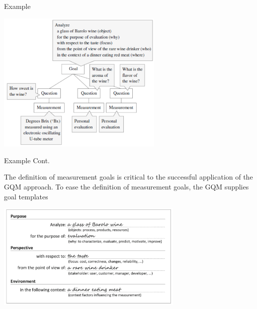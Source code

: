 \documentclass{beamer}
\begin{document}
\begin{frame}{\centerline{Example}}

\begin{center}
\includegraphics[width=80mm]{A2022.IDSEPC.SperimentazioneDeduzione/image-03.png}
\end{center}

\end{frame}

\begin{frame}{\centerline{Example Cont.}}

The definition of measurement goals is critical to the successful application of the GQM approach. To ease the definition of measurement goals, the GQM supplies goal templates
\begin{center}
\includegraphics[width=90mm]{A2022.IDSEPC.SperimentazioneDeduzione/image-04.png}
\end{center}
\end{frame}
\end{document}
